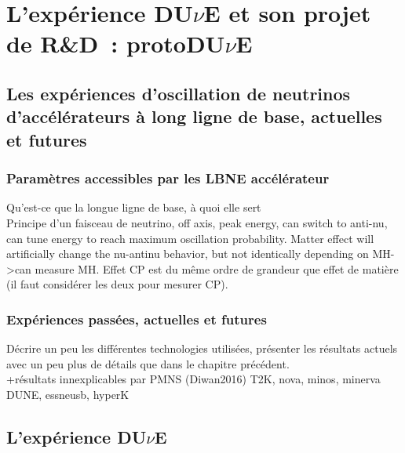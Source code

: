 \chapter{L'expérience \texorpdfstring{DU$\nu$E}{DUNE} et son projet de R\&D~: \texorpdfstring{protoDU$\nu$E}{protoDUNE}}
    
    \section{Les expériences d'oscillation de neutrinos d'accélérateurs à long ligne de base, actuelles et futures}
    
        \subsection{Paramètres accessibles par les LBNE accélérateur}
            
            Qu'est-ce que la longue ligne de base, à quoi elle sert\\
            Principe d'un faisceau de neutrino, off axis, peak energy, can switch to anti-nu, can tune energy to reach maximum oscillation probability. Matter effect will artificially change the nu-antinu behavior, but not identically depending on MH->can measure MH. Effet CP est du même ordre de grandeur que effet de matière (il faut considérer les deux pour mesurer CP).
                
        \subsection{Expériences passées, actuelles et futures}
            Décrire un peu les différentes technologies utilisées, présenter les résultats actuels avec un peu plus de détails que dans le chapitre précédent.\\
            +résultats innexplicables par PMNS (Diwan2016)
            T2K, nova, minos, minerva
            \cite{Diwan2016}\\
            DUNE, essneusb, hyperK
            
        
    \section{L'expérience \texorpdfstring{DU$\nu$E}{DUNE}}
    
